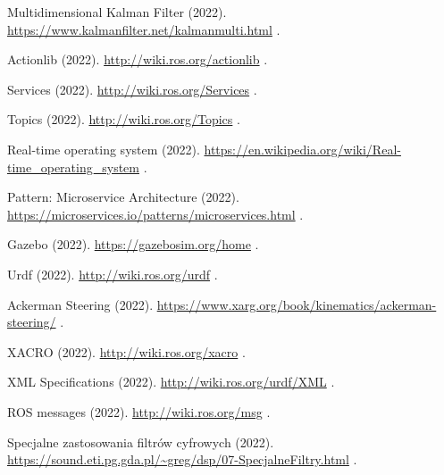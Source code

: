 \begin{thebibliography}{99}
    {Multidimensional Kalman Filter} (2022).
    \newblock \url{https://www.kalmanfilter.net/kalmanmulti.html}
    \newblock [Accessed: 22/12/2022].

    {Actionlib} (2022).
    \newblock \url{http://wiki.ros.org/actionlib}
    \newblock [Accessed: 23/12/2022].

    {Services} (2022).
    \newblock \url{http://wiki.ros.org/Services}
    \newblock [Accessed: 24/12/2022].

    {Topics} (2022).
    \newblock \url{http://wiki.ros.org/Topics}
    \newblock [Accessed: 25/12/2022].

    {Real-time operating system} (2022).
    \newblock \url{https://en.wikipedia.org/wiki/Real-time_operating_system}
    \newblock [Accessed: 26/12/2022].

    {Pattern: Microservice Architecture} (2022).
    \newblock \url{https://microservices.io/patterns/microservices.html}
    \newblock [Accessed: 27/12/2022].

    {Gazebo} (2022).
    \newblock \url{https://gazebosim.org/home}
    \newblock [Accessed: 28/12/2022].

    {Urdf} (2022).
    \newblock \url{http://wiki.ros.org/urdf}
    \newblock [Accessed: 29/12/2022].

    {Ackerman Steering} (2022).
    \newblock \url{https://www.xarg.org/book/kinematics/ackerman-steering/}
    \newblock [Accessed: 30/12/2022].

    {XACRO} (2022).
    \newblock \url{http://wiki.ros.org/xacro}
    \newblock [Accessed: 31/12/2022].

    {XML Specifications} (2022).
    \newblock \url{http://wiki.ros.org/urdf/XML}
    \newblock [Accessed: 01/01/2023].

    {ROS messages} (2022).
    \newblock \url{http://wiki.ros.org/msg}
    \newblock [Accessed: 02/01/2023].

    {Specjalne zastosowania filtrów cyfrowych} (2022).
    \newblock \url{https://sound.eti.pg.gda.pl/~greg/dsp/07-SpecjalneFiltry.html}
    \newblock [Accessed: 03/01/2023].


\end{thebibliography}

